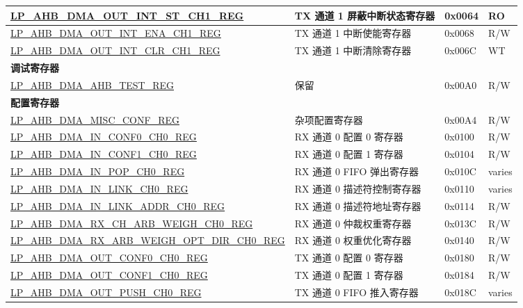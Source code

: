 \begin{longtable}{ | l | l | p{1.3cm} | l | }
\hyperref[regdesc:LPAHBDMAOUTINTSTCHNREG]{LP\_AHB\_DMA\_OUT\_INT\_ST\_CH1\_REG} & TX 通道 1 屏蔽中断状态寄存器 & 0x0064 & RO \\ \hline
\hyperref[regdesc:LPAHBDMAOUTINTENACHNREG]{LP\_AHB\_DMA\_OUT\_INT\_ENA\_CH1\_REG} & TX 通道 1 中断使能寄存器 & 0x0068 & R/W \\ \hline
\hyperref[regdesc:LPAHBDMAOUTINTCLRCHNREG]{LP\_AHB\_DMA\_OUT\_INT\_CLR\_CH1\_REG} & TX 通道 1 中断清除寄存器 & 0x006C & WT \\ \hline
\multicolumn{4}{|l|}{\textbf{调试寄存器}} \\ \hline
\hyperref[regdesc:LPAHBDMAAHBTESTREG]{LP\_AHB\_DMA\_AHB\_TEST\_REG} & 保留 & 0x00A0 & R/W \\ \hline
\multicolumn{4}{|l|}{\textbf{配置寄存器}} \\ \hline
\hyperref[regdesc:LPAHBDMAMISCCONFREG]{LP\_AHB\_DMA\_MISC\_CONF\_REG} & 杂项配置寄存器 & 0x00A4 & R/W \\ \hline
\hyperref[regdesc:LPAHBDMAINCONF0CHNREG]{LP\_AHB\_DMA\_IN\_CONF0\_CH0\_REG} & RX 通道 0 配置 0 寄存器 & 0x0100 & R/W \\ \hline
\hyperref[regdesc:LPAHBDMAINCONF1CHNREG]{LP\_AHB\_DMA\_IN\_CONF1\_CH0\_REG} & RX 通道 0 配置 1 寄存器 & 0x0104 & R/W \\ \hline
\hyperref[regdesc:LPAHBDMAINPOPCHNREG]{LP\_AHB\_DMA\_IN\_POP\_CH0\_REG} & RX 通道 0 FIFO 弹出寄存器 & 0x010C & varies \\ \hline
\hyperref[regdesc:LPAHBDMAINLINKCHNREG]{LP\_AHB\_DMA\_IN\_LINK\_CH0\_REG} & RX 通道 0 描述符控制寄存器 & 0x0110 & varies \\ \hline
\hyperref[regdesc:LPAHBDMAINLINKADDRCHNREG]{LP\_AHB\_DMA\_IN\_LINK\_ADDR\_CH0\_REG} & RX 通道 0 描述符地址寄存器 & 0x0114 & R/W \\ \hline
\hyperref[regdesc:LPAHBDMARXCHARBWEIGHCHNREG]{LP\_AHB\_DMA\_RX\_CH\_ARB\_WEIGH\_CH0\_REG} & RX 通道 0 仲裁权重寄存器 & 0x013C & R/W \\ \hline
\hyperref[regdesc:LPAHBDMARXARBWEIGHOPTDIRCHNREG]{LP\_AHB\_DMA\_RX\_ARB\_WEIGH\_OPT\_DIR\_CH0\_REG} & RX 通道 0 权重优化寄存器 & 0x0140 & R/W \\ \hline
\hyperref[regdesc:LPAHBDMAOUTCONF0CHNREG]{LP\_AHB\_DMA\_OUT\_CONF0\_CH0\_REG} & TX 通道 0 配置 0 寄存器 & 0x0180 & R/W \\ \hline
\hyperref[regdesc:LPAHBDMAOUTCONF1CHNREG]{LP\_AHB\_DMA\_OUT\_CONF1\_CH0\_REG} & TX 通道 0 配置 1 寄存器 & 0x0184 & R/W \\ \hline
\hyperref[regdesc:LPAHBDMAOUTPUSHCHNREG]{LP\_AHB\_DMA\_OUT\_PUSH\_CH0\_REG} & TX 通道 0 FIFO 推入寄存器 & 0x018C & varies \\ \hline

\end{longtable}
